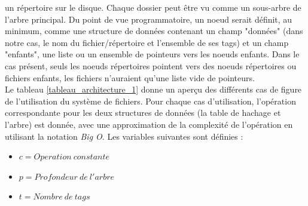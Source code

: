 \documentclass[a4paper, 12pt]{article}
\begin{document}
un répertoire sur le disque. Chaque dossier peut être vu comme un sous-arbre de l'arbre principal.
Du point de vue programmatoire, un noeud serait définit, au minimum, comme une structure de données 
contenant un champ "données" (dans notre cas, le nom du fichier/répertoire et l'ensemble de ses tags) 
et un champ "enfants", une liste ou un ensemble de pointeurs vers les noeuds enfants. Dans le cas 
présent, seuls les noeuds répertoires pointent vers des noeuds répertoires ou fichiers enfants, 
les fichiers n'auraient qu'une liste vide de pointeurs.
\\
Le tableau \ref{tableau_architecture_1} donne un aperçu des différents cas de figure de l'utilisation du système 
de fichiers. Pour chaque cas d'utilisation, l'opération correspondante pour les deux structures de 
données (la table de hachage et l'arbre) est donnée, avec une approximation de la complexité de 
l'opération en utilisant la notation \textit{Big O}. Les variables suivantes sont définies :
\begin{itemize}
    \item $c = Operation \ constante$
    \item $p = Profondeur \ de \ l'arbre$
    \item $t = Nombre \ de \ tags$
\end{itemize}
\end{document}
